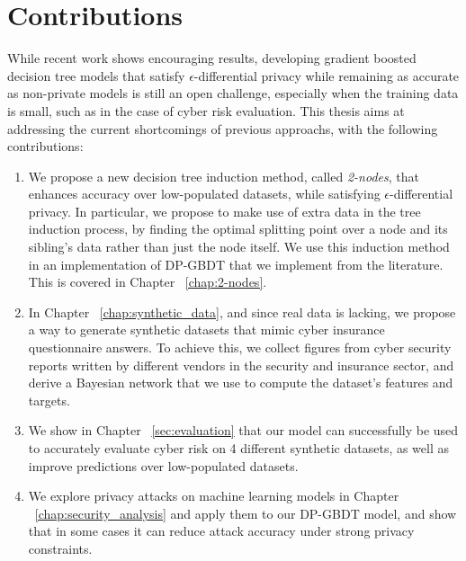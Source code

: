 \section{Contributions}

While recent work shows encouraging results, developing gradient boosted decision tree models that satisfy $\epsilon$-differential privacy while remaining as accurate as non-private models is still an open challenge, especially when the training data is small, such as in the case of cyber risk evaluation. This thesis aims at addressing the current shortcomings of previous approachs, with the following contributions:

\begin{enumerate} 
	\item We propose a new decision tree induction method, called \textit{2-nodes}, that enhances accuracy over low-populated datasets, while satisfying $\epsilon$-differential privacy. In particular, we propose to make use of extra data in the tree induction process, by finding the optimal splitting point over a node and its sibling's data rather than just the node itself. We use this induction method in an implementation of DP-GBDT that we implement from the literature. This is covered in Chapter ~\ref{chap:2-nodes}.

	\item In Chapter ~\ref{chap:synthetic_data}, and since real data is lacking, we propose a way to generate synthetic datasets that mimic cyber insurance questionnaire answers. To achieve this, we collect figures from cyber security reports written by different vendors in the security and insurance sector, and derive a Bayesian network that we use to compute the dataset's features and targets.

	\item We show in Chapter ~\ref{sec:evaluation} that our model can successfully be used to accurately evaluate cyber risk on 4 different synthetic datasets, as well as improve predictions over low-populated datasets. 
	
	\item We explore privacy attacks on machine learning models in Chapter ~\ref{chap:security_analysis} and apply them to our DP-GBDT model, and show that in some cases it can reduce attack accuracy under strong privacy constraints.
\end{enumerate}

